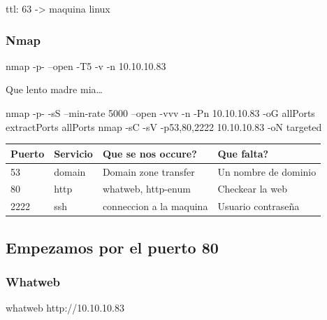 \documentclass{assets/ipesethesis}
\newenvironment{Shaded}{\begin{snugshade}}{\end{snugshade}}
\newcommand{\ExtensionTok}[1]{#1}
\newcommand{\FunctionTok}[1]{\textcolor[rgb]{0.00,0.00,0.00}{#1}}
\newcommand{\NormalTok}[1]{#1}
\begin{document}
ttl: 63 -\textgreater{} maquina linux

\hypertarget{nmap}{%
\subsubsection*{Nmap}\label{nmap}}

\begin{Shaded}
\begin{Highlighting}[]
\FunctionTok{nmap}\NormalTok{ -p- --open -T5 -v -n 10.10.10.83}
\end{Highlighting}
\end{Shaded}

Que lento madre mia\ldots{}

\begin{Shaded}
\begin{Highlighting}[]
\FunctionTok{nmap}\NormalTok{ -p- -sS --min-rate 5000 --open -vvv -n -Pn 10.10.10.83 -oG allPorts}
\ExtensionTok{extractPorts}\NormalTok{ allPorts}
\FunctionTok{nmap}\NormalTok{ -sC -sV -p53,80,2222 10.10.10.83 -oN targeted}
\end{Highlighting}
\end{Shaded}

\begin{longtable}[]{@{}llll@{}}
\toprule
Puerto & Servicio & Que se nos occure? & Que falta?\tabularnewline
\midrule
\endhead
53 & domain & Domain zone transfer & Un nombre de dominio\tabularnewline
80 & http & whatweb, http-enum & Checkear la web\tabularnewline
2222 & ssh & conneccion a la maquina & Usuario contraseña\tabularnewline
\bottomrule
\end{longtable}

\hypertarget{empezamos-por-el-puerto-80}{%
\subsection*{Empezamos por el puerto 80}\label{empezamos-por-el-puerto-80}}

\hypertarget{whatweb}{%
\subsubsection*{Whatweb}\label{whatweb}}

\begin{Shaded}
\begin{Highlighting}[]
\ExtensionTok{whatweb}\NormalTok{ http://10.10.10.83}
\end{Highlighting}
\end{Shaded}
\end{document}
